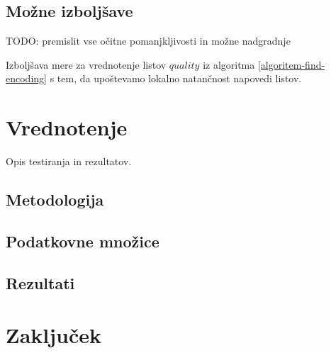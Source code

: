 \documentclass[12pt,a4paper]{article}
\begin{document}


\subsection{Možne izboljšave}

TODO: premislit vse očitne pomanjkljivosti in možne nadgradnje

Izboljšava mere za vrednotenje listov $quality$ iz algoritma \ref{algoritem-find-encoding} s tem, da upoštevamo lokalno natančnost napovedi listov.


\section{Vrednotenje}
Opis testiranja in rezultatov.

\subsection{Metodologija}


\subsection{Podatkovne množice}


\subsection{Rezultati}


\section{Zaključek}  
\end{document}
